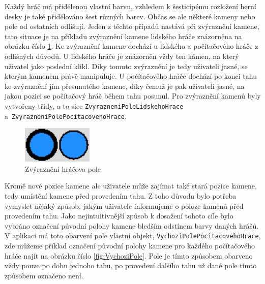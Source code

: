 Každý hráč má přidělenou vlastní barvu, vzhledem k šesticípému rozložení herní desky je také přidělováno šest různých barev. Občas se ale některé kameny nebo pole od ostatních odlišují. Jeden z těchto případů nastává při zvýraznění kamene, tato situace je na příkladu zvýraznění kamene lidského hráče znázorněna na obrázku číslo \ref{fig:ZvyrazneniHracovaPole}. Ke zvýraznění kamene dochází u lidského a počítačového hráče z odlišných důvodů. U lidského hráče je znázorněn vždy ten kámen, na který uživatel jako poslední klikl. Díky tomuto zvýraznění je tedy uživateli jasné, se kterým kamenem právě manipuluje. U počítačového hráče dochází po konci tahu ke zvýraznění jím přesunutého kamene, díky čemuž je pak uživateli jasné, na jakou pozici se počítačový hráč během tahu posunul. Pro zvýraznění kamenů byly vytvořeny třídy, a to sice \lstinline$ZvyrazneniPoleLidskehoHrace$ a~\lstinline$ZvyrazneniPolePocitacovehoHrace$.

\begin{figure}
	\centering
	\includegraphics[width=0.3\textwidth]{Figures/ZvyrazneniHracovaPole.png}
	\caption{Zvýraznění hráčova pole}
    \label{fig:ZvyrazneniHracovaPole}
\end{figure}

Kromě nové pozice kamene ale uživatele může zajímat také stará pozice kamene, tedy umístění kamene před provedením tahu. Z toho důvodu bylo potřeba vymyslet nějaký způsob, jakým uživatele informujeme o poloze kamenů před provedením tahu. Jako nejintuitivnější způsob k dosažení tohoto cíle bylo vybráno označení původní polohy kamene bledším odstínem barvy daných hráčů. V aplikaci má toto obarvení pole vlastní objekt, \lstinline$VychoziPolePocitacovehoHrace$, zde můžeme příklad označení původní polohy kamene pro každého počítačového hráče najít na obrázku číslo \ref{fig:VychoziPole}. Pole je tímto způsobem obarveno vždy pouze po dobu jednoho tahu, po provedení dalšího tahu už dané pole tímto způsobem označeno není.

